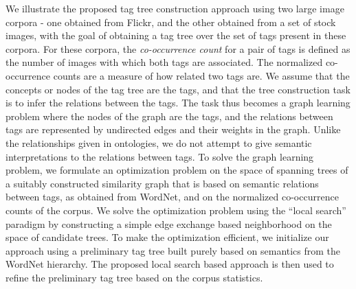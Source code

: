 We illustrate the proposed tag tree construction approach using two large image corpora - one obtained from Flickr, and the other obtained from a set of stock images, with the goal of obtaining a tag tree over the set of tags present in these corpora.
For these corpora, the \emph{co-occurrence count} for a pair of tags is defined as the number of images with which both tags are associated. The normalized co-occurrence counts are a measure of how related two tags are. We assume that the concepts or nodes of the tag tree are the tags, and that the tree construction task is to infer the relations between the tags. The task thus becomes a graph learning problem where the nodes of the graph are the tags, and the relations between tags are represented by undirected edges and their weights in the graph. Unlike the relationships given in ontologies, we do not attempt to give semantic interpretations to the relations between tags. To solve the graph learning problem, we formulate an optimization problem on the space of spanning trees of a suitably constructed similarity graph that is based on semantic relations between tags, as obtained from WordNet, and on the normalized co-occurrence counts of the corpus. We solve the optimization problem using the ``local search'' paradigm by constructing a simple edge exchange based neighborhood on the space of candidate trees. To make the optimization efficient, we initialize our approach using a preliminary tag tree built purely based on semantics from the WordNet hierarchy. The proposed local search based approach is then used to refine the preliminary tag tree based on the corpus statistics.


